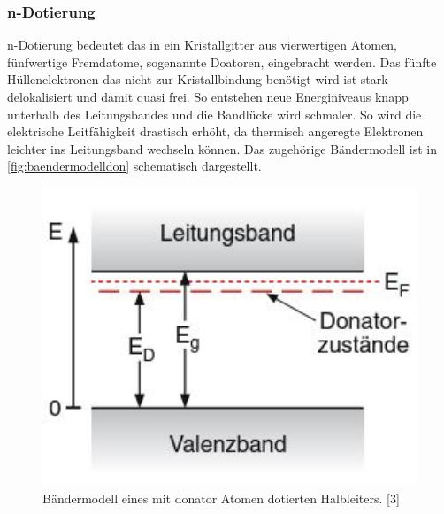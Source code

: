 \subsubsection{n-Dotierung}
\label{sec:ndotierung}
n-Dotierung bedeutet das in ein Kristallgitter aus vierwertigen Atomen, fünfwertige Fremdatome,
sogenannte Doatoren, eingebracht werden. Das fünfte Hüllenelektronen das nicht zur Kristallbindung
benötigt wird ist stark delokalisiert und damit quasi frei. So entstehen neue Energiniveaus knapp unterhalb
des Leitungsbandes und die Bandlücke wird schmaler. So wird die elektrische Leitfähigkeit drastisch erhöht, 
da thermisch angeregte Elektronen leichter ins Leitungsband wechseln können. Das zugehörige Bändermodell
ist in \autoref{fig:baendermodelldon} schematisch dargestellt.
\begin{figure}
  \centering
  \includegraphics[width=1\textwidth]{content/grafiken/donatoren.JPG}
  \caption{Bändermodell eines mit donator Atomen dotierten Halbleiters. [3]}
  \label{fig:baendermodelldon}
\end{figure}
